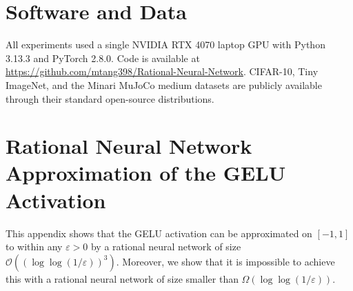 \documentclass{article}
\theoremstyle{plain}
\theoremstyle{definition}
\theoremstyle{remark}
\begin{document}
\section*{Software and Data}
 {All experiments used a single NVIDIA RTX 4070 laptop GPU with Python 3.13.3 and PyTorch 2.8.0. Code is available at \url{https://github.com/mtang398/Rational-Neural-Network}. CIFAR-10, Tiny ImageNet, and the Minari MuJoCo medium datasets are publicly available through their standard open-source distributions.}




\newpage
\appendix
\onecolumn

\section{Rational Neural Network Approximation of the GELU Activation}
\label{app:rational}

This appendix shows that the GELU activation can be approximated on $[-1,1]$ to within any $\varepsilon>0$ by a rational neural network of size $\mathcal{O}((\log\log(1/\varepsilon))^3)$. Moreover, we show that it is impossible to achieve this with a rational neural network of size smaller than $\Omega(\log\log(1/\varepsilon))$. 
\end{document}
